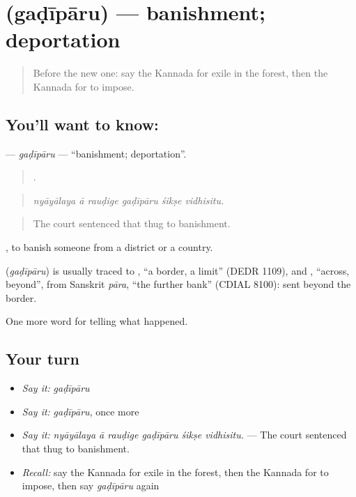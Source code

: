 \section[\texorpdfstring{\kn{ಗಡೀಪಾರು} (gaḍīpāru)}{ಗಡೀಪಾರು (gaḍīpāru)}]{ (gaḍīpāru) — banishment; deportation}

\label{lesson:KA-C372-gadiparu}



\begin{quote}
Before the new one: say the Kannada for exile in the forest, then the Kannada for to impose.
\end{quote}

\subsection*{You'll want to know: }
\textbf{} — \emph{gaḍīpāru} — \textquotedblleft{}banishment; deportation\textquotedblright{}.

\begin{quote}
     .
\end{quote}

\begin{quote}
\emph{nyāyālaya ā rauḍige gaḍīpāru śikṣe vidhisitu.}
\end{quote}

\begin{quote}
The court sentenced that thug to banishment.
\end{quote}

 , to banish someone from a district or a country.

\begin{cousinweb}
\textbf{} (\emph{gaḍīpāru}) is usually traced to , \textquotedblleft{}a border, a limit\textquotedblright{} (DEDR 1109), and , \textquotedblleft{}across, beyond\textquotedblright{}, from Sanskrit \emph{pāra}, \textquotedblleft{}the further bank\textquotedblright{} (CDIAL 8100): sent beyond the border.
\end{cousinweb}

\begin{grammarlens}[title={What you've built}]
One more word for telling what happened.
\end{grammarlens}

\subsection*{Your turn}
\begin{itemize}
\raggedright
  \item \emph{Say it:} \emph{gaḍīpāru}
  \item \emph{Say it:} \emph{gaḍīpāru}, once more
  \item \emph{Say it:} \emph{nyāyālaya ā rauḍige gaḍīpāru śikṣe vidhisitu.} — The court sentenced that thug to banishment.
  \item \emph{Recall:} say the Kannada for exile in the forest, then the Kannada for to impose, then say \emph{gaḍīpāru} again
\end{itemize}

